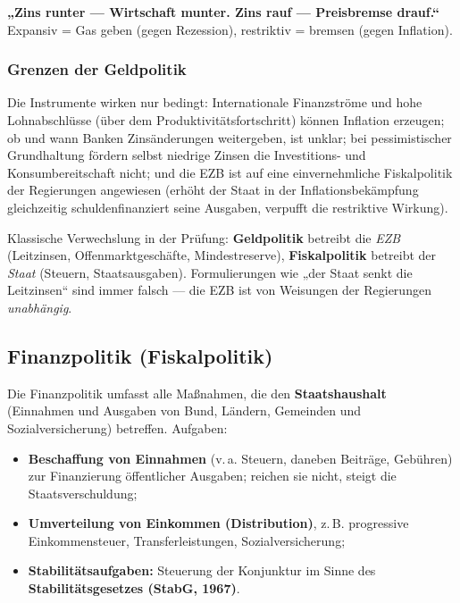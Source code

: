 \documentclass[11pt, a4paper]{article}
\begin{document}
\begin{eselsbruecke}
\textbf{„Zins runter --- Wirtschaft munter. Zins rauf --- Preisbremse drauf.``}
Expansiv = Gas geben (gegen Rezession), restriktiv = bremsen (gegen Inflation).
\end{eselsbruecke}

\subsubsection{Grenzen der Geldpolitik}

Die Instrumente wirken nur bedingt: Internationale Finanzströme und hohe Lohnabschlüsse
(über dem Produktivitätsfortschritt) können Inflation erzeugen; ob und wann Banken
Zinsänderungen weitergeben, ist unklar; bei pessimistischer Grundhaltung fördern selbst
niedrige Zinsen die Investitions- und Konsumbereitschaft nicht; und die EZB ist auf eine
einvernehmliche Fiskalpolitik der Regierungen angewiesen (erhöht der Staat in der
Inflationsbekämpfung gleichzeitig schuldenfinanziert seine Ausgaben, verpufft die
restriktive Wirkung).

\begin{achtung}
Klassische Verwechslung in der Prüfung: \textbf{Geldpolitik} betreibt die \emph{EZB}
(Leitzinsen, Offenmarktgeschäfte, Mindestreserve), \textbf{Fiskalpolitik} betreibt der
\emph{Staat} (Steuern, Staatsausgaben). Formulierungen wie „der Staat senkt die
Leitzinsen`` sind immer falsch --- die EZB ist von Weisungen der Regierungen
\emph{unabhängig}.
\end{achtung}

\subsection{Finanzpolitik (Fiskalpolitik)}

Die Finanzpolitik umfasst alle Maßnahmen, die den \textbf{Staatshaushalt} (Einnahmen und
Ausgaben von Bund, Ländern, Gemeinden und Sozialversicherung) betreffen. Aufgaben:

\begin{itemize}
  \item \textbf{Beschaffung von Einnahmen} (v.\,a. Steuern, daneben Beiträge, Gebühren) zur
    Finanzierung öffentlicher Ausgaben; reichen sie nicht, steigt die Staatsverschuldung;
  \item \textbf{Umverteilung von Einkommen (Distribution)}, z.\,B. progressive
    Einkommensteuer, Transferleistungen, Sozialversicherung;
  \item \textbf{Stabilitätsaufgaben:} Steuerung der Konjunktur im Sinne des
    \textbf{Stabilitätsgesetzes (StabG, 1967)}.
\end{itemize}
\end{document}
